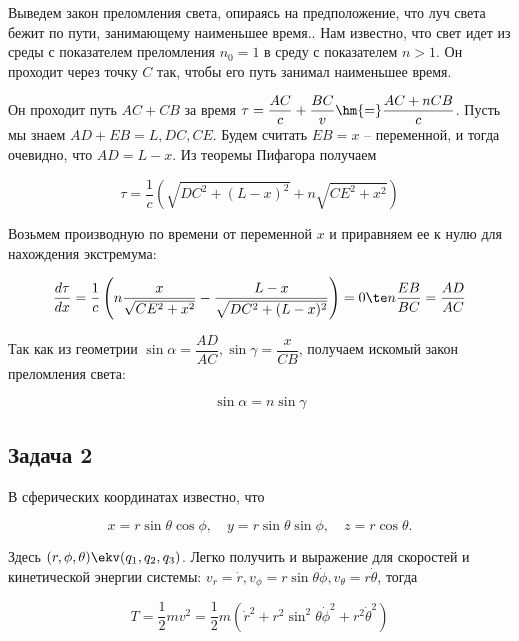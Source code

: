 \documentclass[12pt]{kiarticle}
\begin{document}
Выведем закон преломления света, опираясь на предположение, что луч света бежит по пути, занимающему наименьшее время.. Нам известно, что свет идет из среды с показателем преломления $ n_0 =1  $ в среду с показателем $ n > 1 $. Он проходит через точку $ C $ так, чтобы его путь занимал наименьшее время. 

Он проходит путь $ AC + CB $ за время $ \tau = \dfrac{AC}{c} + \dfrac{BC}{v} \hm{=} \dfrac{AC + nCB}{c} $. Пусть мы знаем $ AD + EB = L, DC, CE $. Будем считать $ EB = x $ -- переменной, и тогда очевидно, что $ AD = L - x $. Из теоремы Пифагора получаем 

\begin{equation}\label{}
\tau = \dfrac{1}{c} \left( \sqrt{DC^2 + (L - x)^2} + n\sqrt{CE^2 + x^2} \right) 
\end{equation}

Возьмем производную по времени от переменной $ x $ и приравняем ее к нулю для нахождения экстремума:

\begin{equation}\label{}
\dfrac{d\tau}{dx} = \dfrac{1}{c} \left( n\dfrac{x}{\sqrt{CE^2 + x^2} } - \dfrac{L - x}{\sqrt{DC^2 + (L - x)^2}} \right) =0 \te n \dfrac{EB}{BC} = \dfrac{AD}{AC}
\end{equation}

Так как из геометрии $ \sin \alpha = \dfrac{AD}{AC}, \sin \gamma = \dfrac{x}{CB} $, получаем искомый закон преломления света:

\begin{equation}\label{}
\sin \alpha = n\sin \gamma
\end{equation}

\subsection{Задача 2}

В сферических координатах известно, что 

\begin{equation}\label{}
x = r\sin\theta\cos\phi, \quad
y = r\sin\theta\sin\phi, \quad
z = r\cos\theta.
\end{equation}

Здесь $ (r, \phi, \theta) \ekv (q_1, q_2, q_3)$. Легко получить и выражение для скоростей и кинетической энергии системы: $ v_r = \dot{r}, v_\phi = r\sin\theta\dot{\phi}, v_\theta = r\dot{\theta} $, тогда 

\begin{equation}\label{}
 T = \dfrac{1}{2} mv^2 = \dfrac{1}{2} m( \dot{r}^2 + r^2\sin^2\theta\dot{\phi}^2 + r^2\dot{\theta}^2)
\end{equation}
\end{document}
